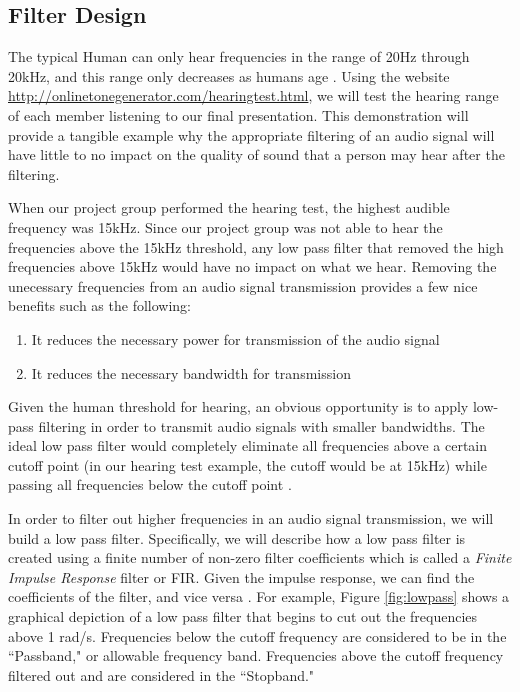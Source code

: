 \subsection{Filter Design}

The typical Human can only hear frequencies in the range of 20Hz through 20kHz, and this range only decreases as humans age  \cite{human:rg}.  Using the website \url{http://onlinetonegenerator.com/hearingtest.html}, we will test the hearing range of each member listening to our final presentation.  This demonstration will provide a tangible example why the appropriate filtering of an audio signal will have little to no impact on the quality of sound that a  person may hear after the filtering.  

When our project group performed the hearing test, the highest audible frequency was 15kHz.  Since our project group was not able to hear the frequencies above the 15kHz threshold, any low pass filter that removed the high frequencies above 15kHz would have no impact on what we hear.  Removing the unecessary frequencies from an audio signal transmission provides a few nice benefits such as the following: 

\begin{enumerate}
\item It reduces the necessary power for transmission of the audio signal
\item It reduces the necessary bandwidth for transmission
\end{enumerate}

Given the human threshold for hearing, an obvious opportunity is to apply low-pass filtering in order to transmit audio signals with smaller bandwidths.  The ideal low pass filter would completely eliminate all frequencies above a certain cutoff point (in our hearing test example, the cutoff would be at 15kHz) while passing all frequencies below the cutoff point \cite{lowpass:wiki}.     

In order to filter out higher frequencies in an audio signal transmission, we will build a low pass filter.  Specifically, we will describe how a low pass filter is created using a finite number of non-zero filter coefficients which is called a \textit{Finite Impulse Response} filter or FIR.  Given the impulse response, we can find the coefficients of the filter, and vice versa \cite{notes:class}.  For example, Figure \ref{fig:lowpass} shows a graphical depiction of a low pass filter that begins to cut out the frequencies above 1 rad/s.  Frequencies below the cutoff frequency are considered to be in the ``Passband," or allowable frequency band.  Frequencies above the cutoff frequency filtered out and are considered in the ``Stopband."  

